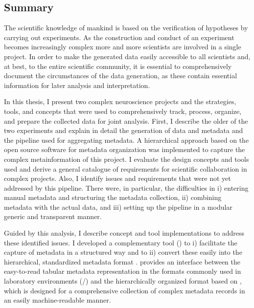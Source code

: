 \cleardoublepage
\thispagestyle{empty}
\subsection*{Summary}
\label{sec:summary}
\begin{minipage}[t][0pt]{\linewidth}
The scientific knowledge of mankind is based on the verification of hypotheses by carrying out experiments.
As the construction and conduct of an experiment becomes increasingly complex more and more scientists are involved in a single project. In order to make the generated data easily accessible to all scientists and, at best, to the entire scientific community, it is essential to comprehensively document the circumstances of the data generation, as these contain essential information for later analysis and interpretation.

In this thesis, I present two complex neuroscience projects and the strategies, tools, and concepts that were used to comprehensively track, process, organize, and prepare the collected data for joint analysis. First, I describe the older of the two experiments and explain in detail the generation of data and metadata and the pipeline used for aggregating metadata. A hierarchical approach based on the open source software  for metadata organization was implemented to capture the complex metainformation of this project. I evaluate the design concepts and tools used and derive a general catalogue of requirements for scientific collaboration in complex projects. Also, I identify issues and requirements that were not yet addressed by this pipeline. There were, in particular, the difficulties in i) entering manual metadata and structuring the metadata collection, ii) combining metadata with the actual data, and iii) setting up the pipeline in a modular generic and transparent manner. 

Guided by this analysis, I describe concept and tool implementations to address these identified issues. I developed a complementary tool () to i) facilitate the capture of metadata in a structured way and to ii) convert these easily into the hierarchical, standardized metadata format .  provides an interface between the easy-to-read tabular metadata representation in the formats commonly used in laboratory environments (/) and the hierarchically organized  format based on , which is designed for a comprehensive collection of complex metadata records in an easily machine-readable manner.


\end{minipage}
